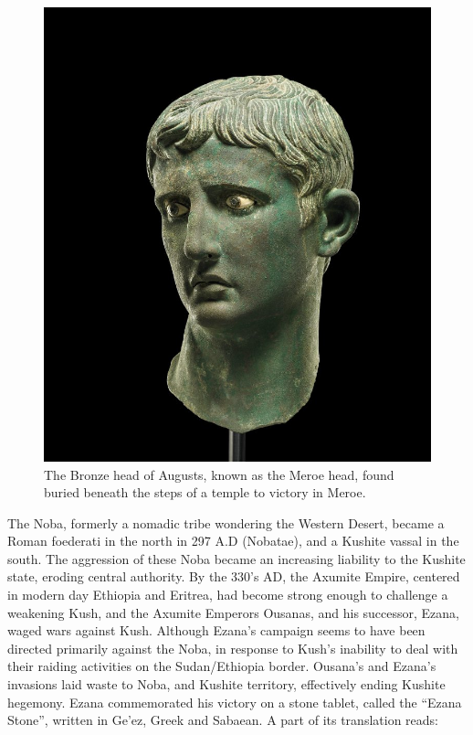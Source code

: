 \documentclass[a4paper,12pt]{scrreprt}
\begin{document}
\begin{figure}[H]
	\centering
	\includegraphics[width=\textwidth]{img/augustus_bronze_head}
	\caption{The Bronze head of Augusts, known as the Meroe head, found buried beneath the steps of a temple to victory in Meroe.}
\end{figure}

The Noba, formerly a nomadic tribe wondering the Western Desert, became a Roman foederati in the north in 297 A.D (Nobatae), and a Kushite vassal in the south. The aggression of these Noba became an increasing liability to the Kushite state, eroding central authority. By the 330’s AD, the Axumite Empire, centered in modern day Ethiopia and Eritrea, had become strong enough to challenge a weakening Kush, and the Axumite Emperors Ousanas, and his successor, Ezana, waged wars against Kush. Although Ezana’s campaign seems to have been directed primarily against the Noba, in response to Kush’s inability to deal with their raiding activities on the Sudan/Ethiopia border. Ousana’s and Ezana’s invasions laid waste to Noba, and Kushite territory, effectively ending Kushite hegemony. Ezana commemorated his victory on a stone tablet, called the “Ezana Stone”, written in Ge’ez, Greek and Sabaean. A part of its translation reads:\\
\end{document}
